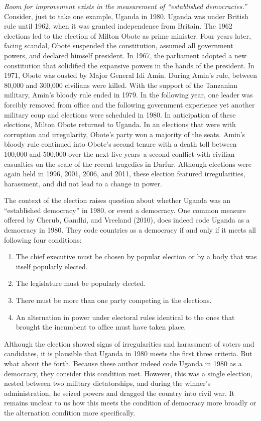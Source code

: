 \documentclass[12pt]{article}
\begin{document}
\textit{Room for improvement exists in the measurement of ``established democracies.''} Consider, just to take one example, Uganda in 1980. Uganda was under British rule until 1962, when it was granted independence from Britain. The 1962 elections led to the election of Milton Obote as prime minister. Four years later, facing scandal, Obote suspended the constitution, assumed all government powers, and declared himself president. In 1967, the parliament adopted a new constitution that solidified the expansive powers in the hands of the president. In 1971, Obote was ousted by Major General Idi Amin. During Amin's rule, between 80,000 and 300,000 civilians were killed. With the support of the Tanzanian military, Amin's bloody rule ended in 1979. In the following year, one leader was forcibly removed from office and the following government experience yet another military coup and elections were scheduled in 1980. In anticipation of these elections, Milton Obote returned to Uganda. In an elections that were with corruption and irregularity, Obote's party won a majority of the seats. Amin's bloody rule continued into Obote's second tenure with a death toll between 100,000 and 500,000 over the next five years--a second conflict with civilian casualties on the scale of the recent tragedies in Darfur. Although elections were again held in 1996, 2001, 2006, and 2011, these election featured irregularities, harassment, and did not lead to a change in power.

The context of the election raises question about whether Uganda was an ``established democracy'' in 1980, or event a democracy. One common measure offered by Cherub, Gandhi, and Vreeland (2010), does indeed code Uganda as a democracy in 1980. They code countries as a democracy if and only if it meets all following four conditions:
\begin{enumerate}
\item The chief executive must be chosen by popular election or by a body that was itself popularly elected.
\item The legislature must be popularly elected.
\item There must be more than one party competing in the elections.
\item An alternation in power under electoral rules identical to the ones that brought the incumbent to office must have taken place.
\end{enumerate}

Although the election showed signs of irregularities and harassment of voters and candidates, it is plausible that Uganda in 1980 meets the first three criteria. But what about the forth. Because these author indeed code Uganda in 1980 as a democracy, they consider this condition met. However, this was a single election, nested between two military dictatorships, and during the winner's administration, he seized powers and dragged the country into civil war. It remains unclear to us how this meets the condition of democracy more broadly or the alternation condition more specifically.
\end{document}
